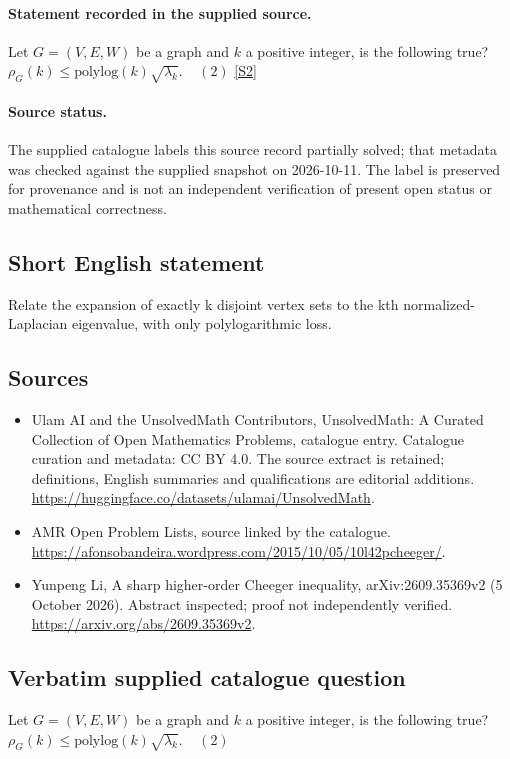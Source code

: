 \documentclass[11pt]{article}
\begin{document}
\paragraph{Statement recorded in the supplied source.}
Let ${G=(V,E,W)}$ be a graph and ${k}$ a positive integer, is the following true? $\rho_G(k) \leq \mathrm{polylog}(k) \sqrt{\lambda_k}. \ \ \ \ \ (2)$ \href{https://afonsobandeira.wordpress.com/2015/10/05/10l42pcheeger/}{[S2]}
\paragraph{Source status.}
The supplied catalogue labels this source record partially solved; that metadata was checked against the supplied snapshot on 2026-10-11. The label is preserved for provenance and is not an independent verification of present open status or mathematical correctness.
\subsection{Short English statement}
Relate the expansion of exactly k disjoint vertex sets to the kth normalized-Laplacian eigenvalue, with only polylogarithmic loss.
\subsection{Sources}
\begin{itemize}
\item[S1] Ulam AI and the UnsolvedMath Contributors, UnsolvedMath: A Curated Collection of Open Mathematics Problems, catalogue entry. Catalogue curation and metadata: CC BY 4.0. The source extract is retained; definitions, English summaries and qualifications are editorial additions.
\url{https://huggingface.co/datasets/ulamai/UnsolvedMath}.
\item[S2] AMR Open Problem Lists, source linked by the catalogue.
\url{https://afonsobandeira.wordpress.com/2015/10/05/10l42pcheeger/}.
\item[S3] Yunpeng Li, A sharp higher-order Cheeger inequality, arXiv:2609.35369v2 (5 October 2026). Abstract inspected; proof not independently verified.
\url{https://arxiv.org/abs/2609.35369v2}.
\end{itemize}
\subsection{Verbatim supplied catalogue question}
Let ${G=(V,E,W)}$ be a graph and ${k}$ a positive integer, is the following true? $\rho_G(k) \leq \mathrm{polylog}(k) \sqrt{\lambda_k}. \ \ \ \ \ (2)$
\end{document}
